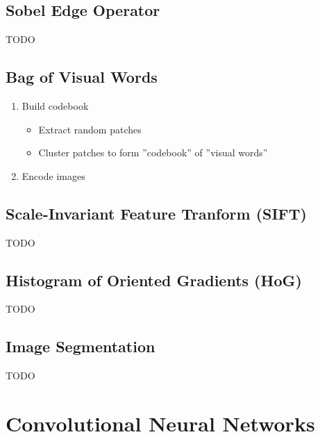 \documentclass{scrartcl}
\begin{document}
\subsection{Sobel Edge Operator}

TODO

\subsection{Bag of Visual Words}

\begin{enumerate}
	\item Build codebook
	\begin{itemize}
		\item Extract random patches
		\item Cluster patches to form ''codebook'' of ''visual words''
	\end{itemize}
	\item Encode images
\end{enumerate}

\subsection{Scale-Invariant Feature Tranform (SIFT)}

TODO

\subsection{Histogram of Oriented Gradients (HoG)}

TODO

\subsection{Image Segmentation}

TODO

\pagebreak
\section{Convolutional Neural Networks}


	
\end{document}
